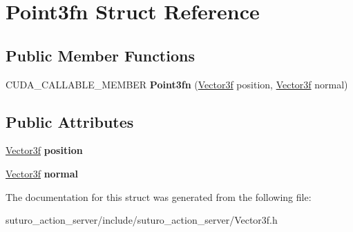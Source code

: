 \hypertarget{structPoint3fn}{\section{Point3fn Struct Reference}
\label{structPoint3fn}
}
\subsection*{Public Member Functions}
\begin{DoxyCompactItemize}
\item 
\hypertarget{structPoint3fn_a2f6d5f3289b86b194656893b853f0ba6}{C\-U\-D\-A\-\_\-\-C\-A\-L\-L\-A\-B\-L\-E\-\_\-\-M\-E\-M\-B\-E\-R {\bfseries Point3fn} (\hyperlink{structVector3f}{Vector3f} position, \hyperlink{structVector3f}{Vector3f} normal)}\label{structPoint3fn_a2f6d5f3289b86b194656893b853f0ba6}

\end{DoxyCompactItemize}
\subsection*{Public Attributes}
\begin{DoxyCompactItemize}
\item 
\hypertarget{structPoint3fn_a87fca59e7907a2b0aaea6f9c403f162a}{\hyperlink{structVector3f}{Vector3f} {\bfseries position}}\label{structPoint3fn_a87fca59e7907a2b0aaea6f9c403f162a}

\item 
\hypertarget{structPoint3fn_af877a85b78f686752acd4b037c8bb6bb}{\hyperlink{structVector3f}{Vector3f} {\bfseries normal}}\label{structPoint3fn_af877a85b78f686752acd4b037c8bb6bb}

\end{DoxyCompactItemize}


The documentation for this struct was generated from the following file\-:\begin{DoxyCompactItemize}
\item 
suturo\-\_\-action\-\_\-server/include/suturo\-\_\-action\-\_\-server/Vector3f.\-h\end{DoxyCompactItemize}
